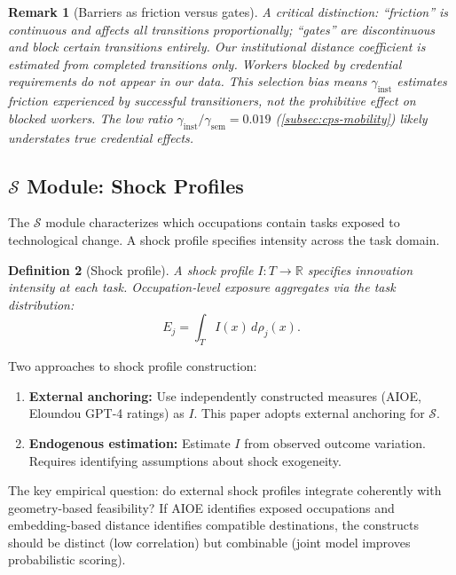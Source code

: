 \documentclass[12pt]{article}
\newtheorem{definition}{Definition}[section]
\newtheorem{remark}[definition]{Remark}
\begin{document}
\begin{remark}[Barriers as friction versus gates]
\label{rem:friction-vs-gates}
A critical distinction: ``friction'' is continuous and affects all transitions proportionally; ``gates'' are discontinuous and block certain transitions entirely. Our institutional distance coefficient is estimated from completed transitions only. Workers blocked by credential requirements do not appear in our data. This selection bias means $\gamma_{\mathrm{inst}}$ estimates friction experienced by successful transitioners, not the prohibitive effect on blocked workers. The low ratio $\gamma_{\mathrm{inst}}/\gamma_{\mathrm{sem}} = 0.019$ (\cref{subsec:cps-mobility}) likely understates true credential effects.
\end{remark}


\subsection{$\mathcal{S}$ Module: Shock Profiles}
\label{subsec:s-module}


The $\mathcal{S}$ module characterizes which occupations contain tasks exposed to technological change. A shock profile specifies intensity across the task domain.


\begin{definition}[Shock profile]
\label{def:shock-profile}
A shock profile $I: T \to \mathbb{R}$ specifies innovation intensity at each task. Occupation-level exposure aggregates via the task distribution:
\[
E_j = \int_T I(x)\, d\rho_j(x).
\]
\end{definition}


Two approaches to shock profile construction:
\begin{enumerate}
    \item \textbf{External anchoring:} Use independently constructed measures (AIOE, Eloundou GPT-4 ratings) as $I$. This paper adopts external anchoring for $\mathcal{S}$.
    \item \textbf{Endogenous estimation:} Estimate $I$ from observed outcome variation. Requires identifying assumptions about shock exogeneity.
\end{enumerate}

The key empirical question: do external shock profiles integrate coherently with geometry-based feasibility? If AIOE identifies exposed occupations and embedding-based distance identifies compatible destinations, the constructs should be distinct (low correlation) but combinable (joint model improves probabilistic scoring).
\end{document}
